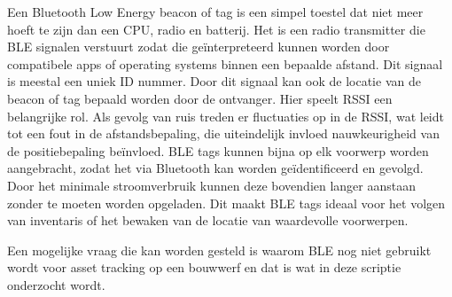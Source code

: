 Een Bluetooth Low Energy  beacon of tag is een simpel toestel dat niet meer hoeft te zijn dan een CPU, radio en batterij. Het is een radio transmitter \autocite{Andony2022} die BLE signalen verstuurt zodat die geïnterpreteerd kunnen worden door compatibele apps of operating systems binnen een bepaalde afstand. Dit signaal is meestal een uniek ID nummer. Door dit signaal kan ook de locatie van de beacon of tag bepaald worden door de ontvanger. Hier speelt RSSI \autocite{Subhan_2019} een belangrijke rol. Als gevolg van ruis treden er fluctuaties op in de RSSI, wat leidt tot een fout in de afstandsbepaling, die uiteindelijk invloed nauwkeurigheid van de positiebepaling beïnvloed. BLE tags kunnen bijna op elk voorwerp worden aangebracht, zodat het via Bluetooth kan worden geïdentificeerd en gevolgd. Door het minimale stroomverbruik kunnen deze bovendien langer aanstaan zonder te moeten worden opgeladen. Dit maakt BLE tags ideaal voor het volgen van inventaris of het bewaken van de locatie van waardevolle voorwerpen.

Een mogelijke vraag die kan worden gesteld is waarom BLE nog niet gebruikt wordt voor asset tracking op een bouwwerf en dat is wat in deze scriptie onderzocht wordt.

%
%
%
%

